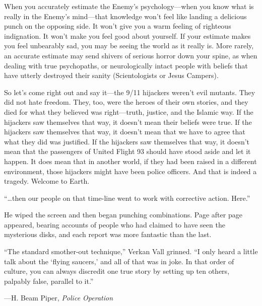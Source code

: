 {
 When you accurately estimate the Enemy's
psychology---when you know what is really in the
Enemy's mind---that knowledge won't
feel like landing a delicious punch on the opposing side. It
won't give you a warm feeling of righteous indignation.
It won't make you feel good about yourself. If your
estimate makes you feel unbearably sad, you may be seeing the world as
it really is. More rarely, an accurate estimate may send shivers of
serious horror down your spine, as when dealing with true psychopaths,
or neurologically intact people with beliefs that have utterly
destroyed their sanity (Scientologists or Jesus Campers).}

{
 So let's come right out and say it---the 9/11
hijackers weren't evil mutants. They did not hate
freedom. They, too, were the heroes of their own stories, and they died
for what they believed was right---truth, justice, and the Islamic way.
If the hijackers saw themselves that way, it doesn't
mean their beliefs were true. If the hijackers saw themselves that way,
it doesn't mean that we have to agree that what they
did was justified. If the hijackers saw themselves that way, it
doesn't mean that the passengers of United Flight 93
should have stood aside and let it happen. It does mean that in another
world, if they had been raised in a different environment, those
hijackers might have been police officers. And that is indeed a
tragedy. Welcome to Earth.}

\myendsectiontext


{
 ``\ldots then our people on that time-line went to
work with corrective action. Here.''}

{
 He wiped the screen and then began punching combinations. Page
after page appeared, bearing accounts of people who had claimed to have
seen the mysterious disks, and each report was more fantastic than the
last.}

{
 ``The standard smother-out
technique,'' Verkan Vall grinned.
``I only heard a little talk about the
`flying saucers,' and all of that was in
joke. In that order of culture, you can always discredit one true story
by setting up ten others, palpably false, parallel to
it.''}

{\raggedleft
 {}---H. Beam Piper, \textit{Police Operation}
\par}


\bigskip


